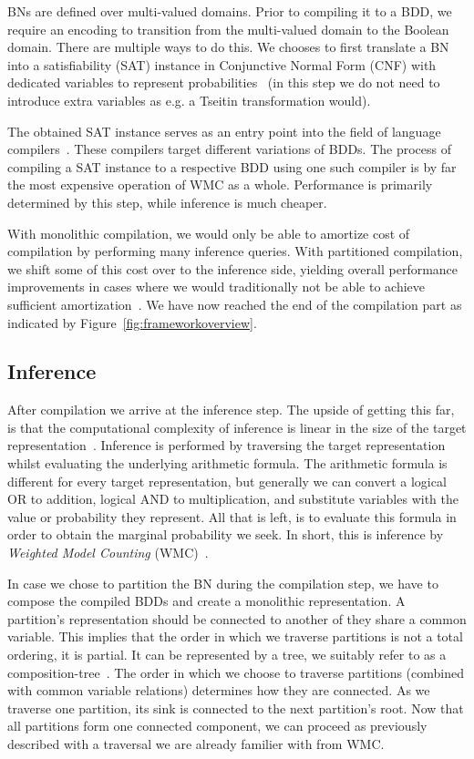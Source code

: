 BNs are defined over multi-valued domains. Prior to compiling it to a BDD, we require an encoding to transition from the multi-valued domain to the Boolean domain. There are multiple ways to do this. We chooses to first translate a BN into a satisfiability (SAT) instance in Conjunctive Normal Form (CNF) with dedicated variables to represent probabilities~\cite{chavira2008probabilistic,dal2017wpbdd} (in this step we do not need to introduce extra variables as e.g. a Tseitin transformation would).

The obtained SAT instance serves as an entry point into the field of language compilers~\cite{dudek2020addmc}. These compilers target different variations of BDDs. The process of compiling a SAT instance to a respective BDD using one such compiler is by far the most expensive operation of WMC as a whole. Performance is primarily determined by this step, while inference is much cheaper.

With monolithic compilation, we would only be able to amortize cost of compilation by performing many inference queries. With partitioned compilation, we shift some of this cost over to the inference side, yielding overall performance improvements in cases where we would traditionally not be able to achieve sufficient amortization~\cite{dal2017reducing}. We have now reached the end of the compilation part as indicated by Figure~\ref{fig:frameworkoverview}.

\subsection{Inference}\label{subsec:inference}

After compilation we arrive at the inference step. The upside of getting this far, is that the computational complexity of inference is linear in the size of the target representation~\cite{darwiche2002knowledge}. Inference is performed by traversing the target representation whilst evaluating the underlying arithmetic formula. The arithmetic formula is different for every target representation, but generally we can convert a logical OR to addition, logical AND to multiplication, and substitute variables with the value or probability they represent. All that is left, is to evaluate this formula in order to obtain the marginal probability we seek. In short, this is inference by \emph{Weighted Model Counting} (WMC)~\cite{chavira2008probabilistic}.

In case we chose to partition the BN during the compilation step, we have to compose the compiled BDDs and create a monolithic representation. A partition's representation should be connected to another of they share a common variable. This implies that the order in which we traverse partitions is not a total ordering, it is partial. It can be represented by a tree, we suitably refer to as a composition-tree~\cite{dal2021compositional}. The order in which we choose to traverse partitions (combined with common variable relations) determines how they are connected. As we traverse one partition, its sink is connected to the next partition's root. Now that all partitions form one connected component, we can proceed as previously described with a traversal we are already familier with from WMC.


